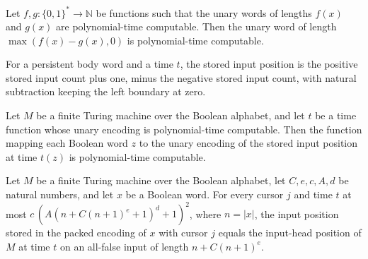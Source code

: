 \begin{lemma}
\label{Complexity.clA5Sub_native}
\leanok
{}
Let $f,g : \{0,1\}^* \to \mathbb{N}$ be functions such that the unary words of lengths
$f(x)$ and $g(x)$ are polynomial-time computable. Then the unary word of length
$\max(f(x)-g(x),0)$ is polynomial-time computable.
\end{lemma}

\begin{definition}
\label{Complexity.clA5InputPos}
\leanok
{}
For a persistent body word and a time $t$, the stored input position is the positive stored input count plus one, minus the negative stored input count, with natural subtraction keeping the left boundary at zero.
\end{definition}

\begin{lemma}
\label{Complexity.clA5InputPos_native}
\leanok
{}
Let $M$ be a finite Turing machine over the Boolean alphabet, and let $t$ be a time
function whose unary encoding is polynomial-time computable. Then the function mapping
each Boolean word $z$ to the unary encoding of the stored input position at time $t(z)$
is polynomial-time computable.
\end{lemma}

\begin{lemma}
\label{Complexity.clA5InputPos_exact}
\leanok
{}
Let $M$ be a finite Turing machine over the Boolean alphabet, let $C,e,c,A,d$ be natural
numbers, and let $x$ be a Boolean word. For every cursor $j$ and time $t$ at most
$c\,(A(n+C(n+1)^e+1)^d+1)^2$, where $n=|x|$, the input position stored in the packed
encoding of $x$ with cursor $j$ equals the input-head position of $M$ at time $t$ on an
all-false input of length $n+C(n+1)^e$.
\end{lemma}

